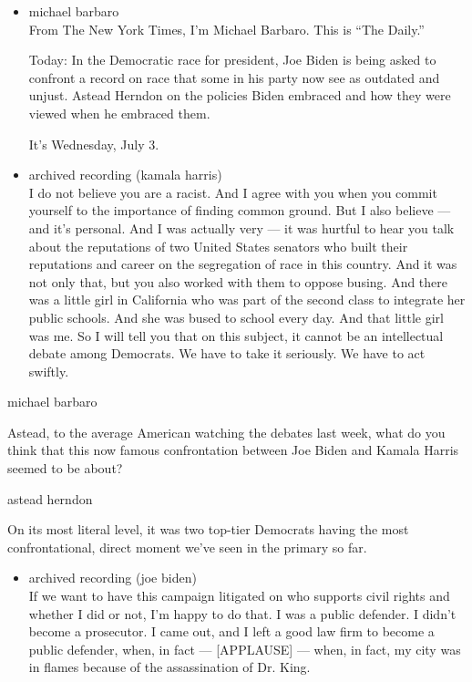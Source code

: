 \begin{itemize}
\item
  michael barbaro\\
  From The New York Times, I'm Michael Barbaro. This is ``The Daily.''

  Today: In the Democratic race for president, Joe Biden is being asked
  to confront a record on race that some in his party now see as
  outdated and unjust. Astead Herndon on the policies Biden embraced and
  how they were viewed when he embraced them.

  It's Wednesday, July 3.
\item
  archived recording (kamala harris)\\
  I do not believe you are a racist. And I agree with you when you
  commit yourself to the importance of finding common ground. But I also
  believe --- and it's personal. And I was actually very --- it was
  hurtful to hear you talk about the reputations of two United States
  senators who built their reputations and career on the segregation of
  race in this country. And it was not only that, but you also worked
  with them to oppose busing. And there was a little girl in California
  who was part of the second class to integrate her public schools. And
  she was bused to school every day. And that little girl was me. So I
  will tell you that on this subject, it cannot be an intellectual
  debate among Democrats. We have to take it seriously. We have to act
  swiftly.
\end{itemize}

michael barbaro

Astead, to the average American watching the debates last week, what do
you think that this now famous confrontation between Joe Biden and
Kamala Harris seemed to be about?

astead herndon

On its most literal level, it was two top-tier Democrats having the most
confrontational, direct moment we've seen in the primary so far.

\begin{itemize}
\tightlist
\item
  archived recording (joe biden)\\
  If we want to have this campaign litigated on who supports civil
  rights and whether I did or not, I'm happy to do that. I was a public
  defender. I didn't become a prosecutor. I came out, and I left a good
  law firm to become a public defender, when, in fact --- {[}APPLAUSE{]}
  --- when, in fact, my city was in flames because of the assassination
  of Dr. King.
\end{itemize}

